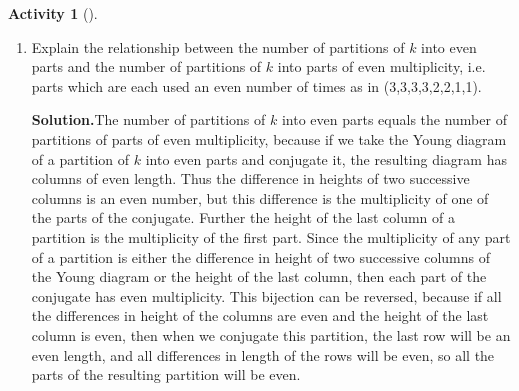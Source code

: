\documentclass[10pt,]{book}
\theoremstyle{plain}
\theoremstyle{definition}
\newtheorem{activity}[project]{Activity}
\numberwithin{equation}{chapter}
\begin{document}
\begin{activity}[]
\begin{enumerate}[label=(\alph*)]
~\par
\item Explain the relationship between the number of partitions of \(k\) into even parts and the number of partitions of \(k\) into parts of even multiplicity, i.e. parts which are each used an even number of times as in (3,3,3,3,2,2,1,1).%
\par\medskip\noindent%
\textbf{Solution.}\quad The number of partitions of \(k\) into even parts equals the number of partitions of parts of even multiplicity, because if we take the Young diagram of a partition of \(k\) into even parts and conjugate it, the resulting diagram has columns of even length. Thus the difference in heights of two successive columns is an even number, but this difference is the multiplicity of one of the parts of the conjugate. Further the height of the last column of a partition is the multiplicity of the first part. Since the multiplicity of any part of a partition is either the difference in height of two successive columns of the Young diagram or the height of the last column, then each part of the conjugate has even multiplicity. This bijection can be reversed, because if all the differences in height of the columns are even and the height of the last column is even, then when we conjugate this partition, the last row will be an even length, and all differences in length of the rows will be even, so all the parts of the resulting partition will be even.%

\end{enumerate}
\end{activity}
\end{document}
